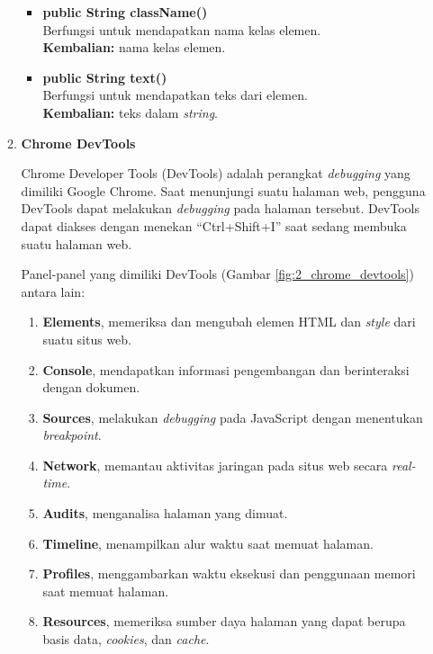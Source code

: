 \documentclass[a4paper,twoside]{article}
\begin{document}
\begin{enumerate}
\begin{enumerate}
\begin{itemize}
		\item \textbf{public String className()} \\
		Berfungsi untuk mendapatkan nama kelas elemen. \\
		\textbf{Kembalian:} nama kelas elemen.	
		
		\item \textbf{public String text()} \\
		Berfungsi untuk mendapatkan teks dari elemen. \\
		\textbf{Kembalian:} teks dalam \textit{string}.	
\end{itemize}



\item \textbf{Chrome DevTools}

Chrome Developer Tools (DevTools) adalah perangkat \textit{debugging} yang dimiliki Google Chrome\cite{devtools}. Saat menunjungi suatu halaman web, pengguna DevTools dapat melakukan \textit{debugging} pada halaman tersebut. DevTools dapat diakses dengan menekan ``Ctrl+Shift+I'' saat sedang membuka suatu halaman web.  

Panel-panel yang dimiliki DevTools (Gambar \ref{fig:2_chrome_devtools}) antara lain:
\begin{enumerate}
	\item \textbf{Elements}, memeriksa dan mengubah elemen HTML dan \textit{style} dari suatu situs web.
	\item \textbf{Console}, mendapatkan informasi pengembangan dan berinteraksi dengan dokumen.
	\item \textbf{Sources}, melakukan \textit{debugging} pada JavaScript dengan menentukan \textit{breakpoint}.
	\item \textbf{Network}, memantau aktivitas jaringan pada situs web secara \textit{real-time}.
	\item \textbf{Audits}, menganalisa halaman yang dimuat.
	\item \textbf{Timeline}, menampilkan alur waktu saat memuat halaman.
	\item \textbf{Profiles}, menggambarkan waktu eksekusi dan penggunaan memori saat memuat halaman.
	\item \textbf{Resources}, memeriksa sumber daya halaman yang dapat berupa basis data, \textit{cookies}, dan \textit{cache}.
\end{enumerate}


\end{enumerate}
\end{enumerate}
\end{document}
